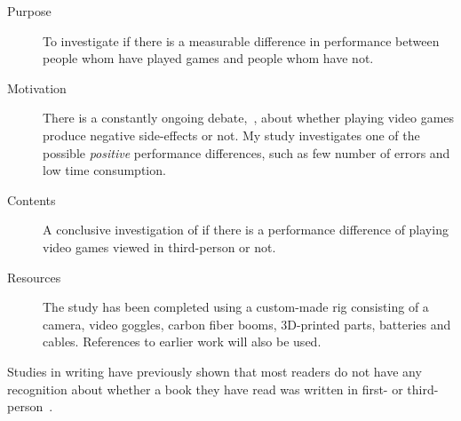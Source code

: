 \documentclass[runningheads,a4paper,oribibl]{llncs}
\begin{document}
\begin{description}
   \item[Purpose] To investigate if there is a measurable difference in performance between people whom have played games and people whom have not.
   \item[Motivation] There is a constantly ongoing debate,~\cite{valadez2012just}, about whether playing video games produce negative side-effects or not. My study investigates one of the possible \emph{positive} performance differences, such as few number of errors and low time consumption.
   \item[Contents] A conclusive investigation of if there is a performance difference of playing video games viewed in third-person or not.
   \item[Resources] The study has been completed using a custom-made rig consisting of a camera, video goggles, carbon fiber booms, 3D-printed parts, batteries and cables. References to earlier work will also be used.
\end{description}




Studies in writing have previously shown that most readers do not have any recognition about whether a book they have read was written in first- or third-person~\cite{hagg2012nya}. 












\end{document}
